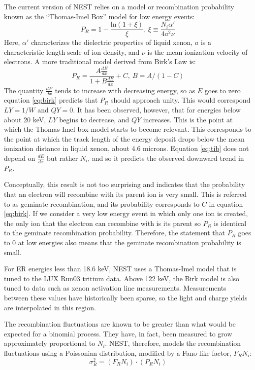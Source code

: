 The current version of NEST relies on a model or recombination probability known as the ``Thomas-Imel Box'' model for low energy events\cite{nest1,tib1,tib2}:
\begin{equation}\label{eq:tib}
P_R=1-\frac{\text{ln}(1+\xi)}{\xi} \text{, } \xi \equiv \frac{N_i \alpha'}{4a^2\nu}
\end{equation}
Here, $\alpha'$ characterizes the dielectric properties of liquid xenon, $a$ is a characteristic length scale of ion density, and $\nu$ is the mean ionization velocity of electrons. A more traditional model derived from Birk's Law is\cite{nest1}:
\begin{equation}\label{eq:birk}
P_R=\frac{A\frac{dE}{dx}}{1+B\frac{dE}{dx}}+C , \ B=A/(1-C)
\end{equation}
The quantity $\frac{dE}{dx}$ tends to increase with decreasing energy, so as $E$ goes to zero equation \ref{eq:birk} predicts that $P_R$ should approach unity. This would correspond $LY=1/W$ and $QY=0$. It has been observed, however, that for energies below about 20 keV, $LY$ begins to decrease, and $QY$ increases. This is the point at which the Thomas-Imel box model starts to become relevant. This corresponds to the point at which the track length of the energy deposit drops below the mean ionization distance in liquid xenon, about 4.6 microns. Equation \ref{eq:tib} does not depend on $\frac{dE}{dx}$ but rather $N_i$, and so it predicts the observed downward trend in $P_R$.  

Conceptually, this result is not too surprising and indicates that the probability that an electron will recombine with its parent ion is very small. This is referred to as geminate recombination, and its probability corresponds to $C$ in equation \ref{eq:birk}. If we consider a very low energy event in which only one ion is created, the only ion that the electron can recombine with is its parent so $P_R$ is identical to the geminate recombination probability. Therefore, the statement that $P_R$ goes to 0 at low energies also means that the geminate recombination probability is small.

For ER energies less than 18.6 keV, NEST uses a Thomas-Imel model that is tuned to the LUX Run03 tritium data\cite{lux_tritium}. Above 122 keV, the Birk model is also tuned to data such as xenon activation line measurements. Measurements between these values have historically been sparse, so the light and charge yields are interpolated in this region.

The recombination fluctuations are known to be greater than what would be expected for a binomial process. They have, in fact, been measured to grow approximately proportional to $N_i$\cite{attila}. NEST, therefore, models the recombination fluctuations using a Poissonian distribution, modified by a Fano-like factor, $F_RN_i$\cite{Evanyields}:
\begin{equation}
\sigma_R^2=(F_RN_i)\cdot (P_RN_i)
\end{equation}

